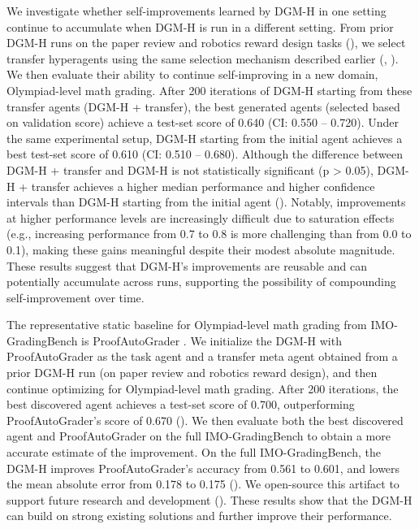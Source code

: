 \documentclass{article}
\begin{document}
We investigate whether self-improvements learned by DGM-H in one setting continue to accumulate when DGM-H is run in a different setting. From prior DGM-H runs on the paper review and robotics reward design tasks (), we select transfer hyperagents using the same selection mechanism described earlier (, ). We then evaluate their ability to continue self-improving in a new domain, Olympiad-level math grading. After 200 iterations of DGM-H starting from these transfer agents (DGM-H + transfer), the best generated agents (selected based on validation score) achieve a test-set score of 0.640 (CI: 0.550 -- 0.720). Under the same experimental setup, DGM-H starting from the initial agent achieves a best test-set score of 0.610 (CI: 0.510 -- 0.680). Although the difference between DGM-H + transfer and DGM-H is not statistically significant (p > 0.05), DGM-H + transfer achieves a higher median performance and higher confidence intervals than DGM-H starting from the initial agent (). Notably, improvements at higher performance levels are increasingly difficult due to saturation effects (e.g., increasing performance from 0.7 to 0.8 is more challenging than from 0.0 to 0.1), making these gains meaningful despite their modest absolute magnitude. These results suggest that DGM-H's improvements are reusable and can potentially accumulate across runs, supporting the possibility of compounding self-improvement over time.

The representative static baseline for Olympiad-level math grading from IMO-GradingBench is ProofAutoGrader \citep{luong2025towards}. We initialize the DGM-H with ProofAutoGrader as the task agent and a transfer meta agent obtained from a prior DGM-H run (on paper review and robotics reward design), and then continue optimizing for Olympiad-level math grading. After 200 iterations, the best discovered agent achieves a test-set score of 0.700, outperforming ProofAutoGrader's score of 0.670 (). We then evaluate both the best discovered agent and ProofAutoGrader on the full IMO-GradingBench to obtain a more accurate estimate of the improvement. On the full IMO-GradingBench, the DGM-H improves ProofAutoGrader's accuracy from 0.561 to 0.601, and lowers the mean absolute error from 0.178 to 0.175 (). We open-source this artifact to support future research and development (). These results show that the DGM-H can build on strong existing solutions and further improve their performance.
\end{document}
